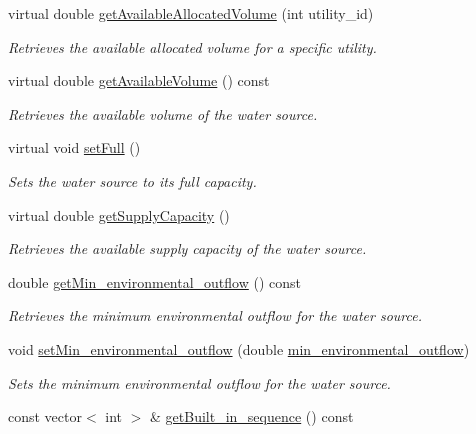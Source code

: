 \begin{DoxyCompactItemize}
virtual double \mbox{\hyperlink{classWaterSource_ad4667296dc6b6dabc36b871529ca2749}{get\+Available\+Allocated\+Volume}} (int utility\+\_\+id)
\begin{DoxyCompactList}\small\item\em Retrieves the available allocated volume for a specific utility. \end{DoxyCompactList}\item 
virtual double \mbox{\hyperlink{classWaterSource_acb9e57253157c969fa57fc6e7b35ab68}{get\+Available\+Volume}} () const
\begin{DoxyCompactList}\small\item\em Retrieves the available volume of the water source. \end{DoxyCompactList}\item 
virtual void \mbox{\hyperlink{classWaterSource_a86999f23ec7f4fb518adb88e16f156a7}{set\+Full}} ()
\begin{DoxyCompactList}\small\item\em Sets the water source to its full capacity. \end{DoxyCompactList}\item 
virtual double \mbox{\hyperlink{classWaterSource_aeefcddb0119d5aab95dab03912a65cad}{get\+Supply\+Capacity}} ()
\begin{DoxyCompactList}\small\item\em Retrieves the available supply capacity of the water source. \end{DoxyCompactList}\item 
double \mbox{\hyperlink{classWaterSource_af7607924825ffe293179b09fe1bc466e}{get\+Min\+\_\+environmental\+\_\+outflow}} () const
\begin{DoxyCompactList}\small\item\em Retrieves the minimum environmental outflow for the water source. \end{DoxyCompactList}\item 
void \mbox{\hyperlink{classWaterSource_a406246432d29f49189d53207ab1d895a}{set\+Min\+\_\+environmental\+\_\+outflow}} (double \mbox{\hyperlink{classWaterSource_adae67ac96597e4b25332002b88a9a52b}{min\+\_\+environmental\+\_\+outflow}})
\begin{DoxyCompactList}\small\item\em Sets the minimum environmental outflow for the water source. \end{DoxyCompactList}\item 
const vector$<$ int $>$ \& \mbox{\hyperlink{classWaterSource_a1e28dee97f62fbb9845300fc2768d172}{get\+Built\+\_\+in\+\_\+sequence}} () const

\end{DoxyCompactItemize}
